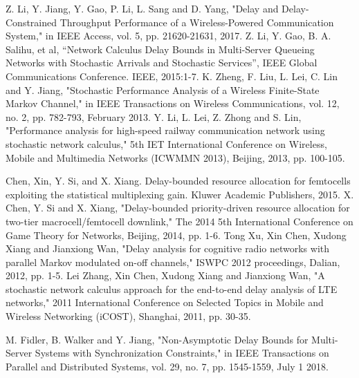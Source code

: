 \documentclass[conference]{IEEEtran}
\begin{document}
\begin{thebibliography}{00}
 Z. Li, Y. Jiang, Y. Gao, P. Li, L. Sang and D. Yang, "Delay and Delay-Constrained Throughput Performance of a Wireless-Powered Communication System," in IEEE Access, vol. 5, pp. 21620-21631, 2017.
 Z. Li, Y. Gao, B. A. Salihu, et al, “Network Calculus Delay Bounds in Multi-Server Queueing Networks with Stochastic Arrivals and Stochastic Services”, IEEE Global Communications Conference. IEEE, 2015:1-7.
 K. Zheng, F. Liu, L. Lei, C. Lin and Y. Jiang, "Stochastic Performance Analysis of a Wireless Finite-State Markov Channel," in IEEE Transactions on Wireless Communications, vol. 12, no. 2, pp. 782-793, February 2013.
 Y. Li, L. Lei, Z. Zhong and S. Lin, "Performance analysis for high-speed railway communication network using stochastic network calculus," 5th IET International Conference on Wireless, Mobile and Multimedia Networks (ICWMMN 2013), Beijing, 2013, pp. 100-105.

 Chen, Xin, Y. Si, and X. Xiang. Delay-bounded resource allocation for femtocells exploiting the statistical multiplexing gain. Kluwer Academic Publishers, 2015.
 X. Chen, Y. Si and X. Xiang, "Delay-bounded priority-driven resource allocation for two-tier macrocell/femtocell downlink," The 2014 5th International Conference on Game Theory for Networks, Beijing, 2014, pp. 1-6.
 Tong Xu, Xin Chen, Xudong Xiang and Jianxiong Wan, "Delay analysis for cognitive radio networks with parallel Markov modulated on-off channels," ISWPC 2012 proceedings, Dalian, 2012, pp. 1-5.
 Lei Zhang, Xin Chen, Xudong Xiang and Jianxiong Wan, "A stochastic network calculus approach for the end-to-end delay analysis of LTE networks," 2011 International Conference on Selected Topics in Mobile and Wireless Networking (iCOST), Shanghai, 2011, pp. 30-35.

 M. Fidler, B. Walker and Y. Jiang, "Non-Asymptotic Delay Bounds for Multi-Server Systems with Synchronization Constraints," in IEEE Transactions on Parallel and Distributed Systems, vol. 29, no. 7, pp. 1545-1559, July 1 2018.


\end{thebibliography}
\end{document}
